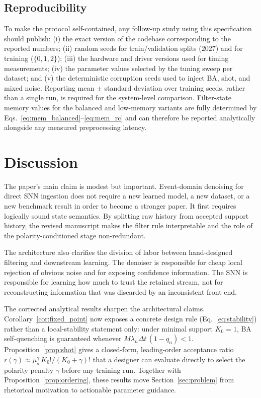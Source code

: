\documentclass[a4paper,fleqn]{cas-dc}
\begin{document}
\subsection{Reproducibility}

To make the protocol self-contained, any follow-up study using this specification should publish: (i) the exact version of the codebase corresponding to the reported numbers; (ii) random seeds for train/validation splits ($2027$) and for training ($\{0,1,2\}$); (iii) the hardware and driver versions used for timing measurements; (iv) the parameter values selected by the tuning sweep per dataset; and (v) the deterministic corruption seeds used to inject BA, shot, and mixed noise. Reporting mean $\pm$ standard deviation over training seeds, rather than a single run, is required for the system-level comparison. Filter-state memory values for the balanced and low-memory variants are fully determined by Eqs.~\eqref{eq:mem_balanced}--\eqref{eq:mem_rc} and can therefore be reported analytically alongside any measured preprocessing latency.

\section{Discussion}
\label{sec:discussion}

The paper's main claim is modest but important. Event-domain denoising for direct SNN ingestion does not require a new learned model, a new dataset, or a new benchmark result in order to become a stronger paper. It first requires logically sound state semantics. By splitting raw history from accepted support history, the revised manuscript makes the filter rule interpretable and the role of the polarity-conditioned stage non-redundant.

The architecture also clarifies the division of labor between hand-designed filtering and downstream learning. The denoiser is responsible for cheap local rejection of obvious noise and for exposing confidence information. The SNN is responsible for learning how much to trust the retained stream, not for reconstructing information that was discarded by an inconsistent front end.

The corrected analytical results sharpen the architectural claims. Corollary~\ref{cor:fixed_point} now exposes a concrete design rule (Eq.~\ref{eq:stability}) rather than a local-stability statement only: under minimal support $K_0{=}1$, BA self-quenching is guaranteed whenever $M\lambda_n\Delta t\,(1-q_n)<1$. Proposition~\ref{prop:shot} gives a closed-form, leading-order acceptance ratio $r(\gamma)\approx \mu_s^\gamma\,K_0!/(K_0+\gamma)!$ that a designer can evaluate directly to select the polarity penalty $\gamma$ before any training run. Together with Proposition~\ref{prop:ordering}, these results move Section~\ref{sec:problem} from rhetorical motivation to actionable parameter guidance.
\end{document}
